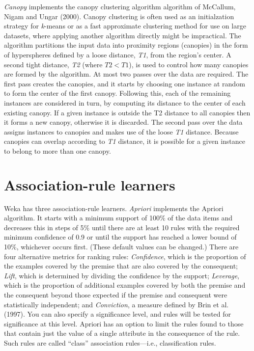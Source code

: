 \textit{Canopy} implements the canopy clustering algorithm algorithm
of McCallum, Nigam and Ungar (2000). Canopy clustering is often used
as an initialzation strategy for \textit{k}-means or as a fast
approximate clustering method for use on large datasets, where
applying another algorithm directly might be impractical. The
algorithm partitions the input data into proximity regions (canopies)
in the form of hyperspheres defined by a loose distance, \textit{T1},
from the region's center. A second tight distance, \textit{T2} (where
$T2 < T1$), is used to control how many canopies are formed by the
algorithm. At most two passes over the data are required. The first
pass creates the canopies, and it starts by choosing one instance at
random to form the center of the first canopy. Following this, each of
the remaining instances are considered in turn, by computing its
distance to the center of each existing canopy. If a given instance is
outside the T2 distance to all canopies then it forms a new canopy,
otherwise it is discarded. The second pass over the data assigns
instances to canopies and makes use of the loose \textit{T1}
distance. Because canopies can overlap according to \textit{T1}
distance, it is possible for a given instance to belong to more than
one canopy.

\section{Association-rule learners}

Weka has three association-rule learners. \textit{Apriori} implements
the Apriori algorithm. It starts with a minimum support of 100\% of
the data items and decreases this in steps of 5\% until there are at
least 10 rules with the required minimum confidence of 0.9 or until
the support has reached a lower bound of 10\%, whichever occurs
first. (These default values can be changed.) There are four
alternative metrics for ranking rules: \textit{Confidence}, which is
the proportion of the examples covered by the premise that are also
covered by the consequent; \textit{Lift}, which is determined by
dividing the confidence by the support; \textit{Leverage}, which is
the proportion of additional examples covered by both the premise and
the consequent beyond those expected if the premise and consequent
were statistically independent; and \textit{Conviction}, a measure defined by
Brin et al. (1997). You can also specify a significance level, and
rules will be tested for significance at this level. Apriori has an
option to limit the rules found to those that contain just the value
of a single attribute in the consequence of the rule. Such rules are
called ``class'' association rules---i.e., classification rules.

